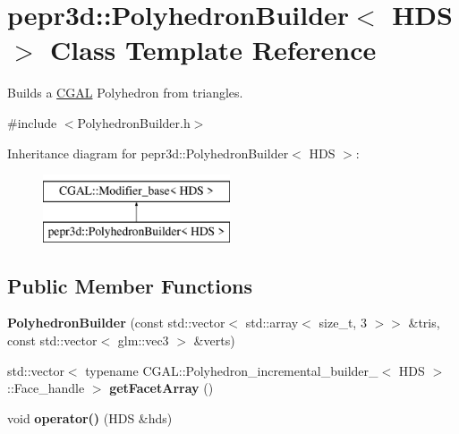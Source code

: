 \hypertarget{classpepr3d_1_1_polyhedron_builder}{}\section{pepr3d\+::Polyhedron\+Builder$<$ H\+DS $>$ Class Template Reference}
\label{classpepr3d_1_1_polyhedron_builder}


Builds a \mbox{\hyperlink{namespace_c_g_a_l}{C\+G\+AL}} Polyhedron from triangles.  




{\ttfamily \#include $<$Polyhedron\+Builder.\+h$>$}

Inheritance diagram for pepr3d\+::Polyhedron\+Builder$<$ H\+DS $>$\+:\begin{figure}[H]
\begin{center}
\leavevmode
\includegraphics[height=2.000000cm]{classpepr3d_1_1_polyhedron_builder}
\end{center}
\end{figure}
\subsection*{Public Member Functions}
\begin{DoxyCompactItemize}
\item 
\mbox{\label{classpepr3d_1_1_polyhedron_builder_ade2aac3429d816f8f33b42f82c090227}} 
{\bfseries Polyhedron\+Builder} (const std\+::vector$<$ std\+::array$<$ size\+\_\+t, 3 $>$$>$ \&tris, const std\+::vector$<$ glm\+::vec3 $>$ \&verts)
\item 
\mbox{\label{classpepr3d_1_1_polyhedron_builder_a5c36edf689effc6e9fb14ff9bcfd3171}} 
std\+::vector$<$ typename C\+G\+A\+L\+::\+Polyhedron\+\_\+incremental\+\_\+builder\+\_$<$ H\+DS $>$\+::Face\+\_\+handle $>$ {\bfseries get\+Facet\+Array} ()
\item 
\mbox{\label{classpepr3d_1_1_polyhedron_builder_aa0b87009527c00ab2bcf50fbfdad888f}} 
void {\bfseries operator()} (H\+DS \&hds)
\end{DoxyCompactItemize}
